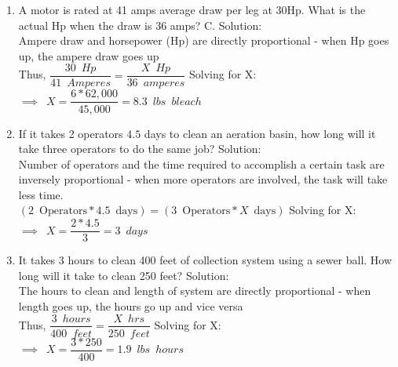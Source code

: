 \begin{enumerate}
\item A motor is rated at 41 amps average draw per leg at $30 \mathrm{Hp}$. What is the actual $\mathrm{Hp}$ when the draw is 36 amps? C. 
\vspace{0.2cm}
Solution:\\
\vspace{0.2cm}
Ampere draw and horsepower (Hp) are directly proportional - when Hp goes up, the ampere draw goes up\\
\vspace{0.2cm}
Thus, $\dfrac{30 \enspace Hp}{41 \enspace Amperes }=\dfrac{X \enspace Hp}{36 \enspace amperes}$
\vspace{0.2cm}
Solving for X:\\
\vspace{0.2cm}
$\implies \enspace X=\dfrac{6*62,000}{45,000}=\boxed{8.3 \enspace lbs \enspace bleach}$
\vspace{0.2cm}
\item If it takes 2 operators $4.5$ days to clean an aeration basin, how long will it take three operators to do the same job?
\vspace{0.2cm}
Solution:\\
\vspace{0.2cm}
Number of operators and the time required to accomplish a certain task are inversely proportional - when more operators are involved, the task will take less time.\\
\vspace{0.2cm}
$(2 \enspace \mathrm{Operators} * 4.5 \enspace \mathrm{days})=(3 \enspace \mathrm{Operators} * X \enspace \mathrm{days})$
\vspace{0.2cm}
Solving for X:\\
\vspace{0.2cm}
$\implies \enspace X=\dfrac{2*4.5}{3}=\boxed{3 \enspace days}$
\vspace{0.2cm}
\item It takes 3 hours to clean 400 feet of collection system using a sewer ball. How long will it take to clean 250 feet?
Solution:\\
\vspace{0.2cm}
The hours to clean and length of system are directly proportional - when length goes up, the hours go up and vice versa\\
\vspace{0.2cm}
Thus, $\dfrac{3 \enspace hours}{400 \enspace feet }=\dfrac{X \enspace hrs}{250 \enspace feet}$
\vspace{0.2cm}
Solving for X:\\
\vspace{0.2cm}
$\implies \enspace X=\dfrac{3*250}{400}=\boxed{1.9 \enspace lbs \enspace hours}$
\vspace{0.2cm}


\end{enumerate}
